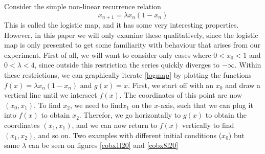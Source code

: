 \documentclass[12pt,oneside,a4paper]{article}
\numberwithin{equation}{section}
\begin{document}
{{{{Consider the simple non-linear recurrence relation
\begin{equation}
x_{n+1}=\lambda x_n (1-x_n)
\label{logmap}
\end{equation}
This is called the logistic map, and it has some very interesting properties. However, in this paper we will only examine these qualitatively, since the logistic map is only presented to get some familiarity with behaviour that arises from our experiment. First of all, we will want to consider only cases where $0<x_0<1$ and $0<\lambda<4$, since outside this restriction the series quickly diverges to $-\infty$. Within these restrictions, we can graphically iterate \eqref{logmap} by plotting the functions $f(x)=\lambda x_n (1-x_n)$ and $g(x)=x$. First, we start off with an $x_0$ and draw a vertical line until we intersect $f(x)$. The coordinates of this point are now $(x_0,x_1)$. To find $x_2$, we need to find$x_1$ on the $x$-axis, such that we can plug it into $f(x)$ to obtain $x_2$. Therefor, we go horizontally to $g(x)$ to obtain the coordinates $(x_1,x_1)$, and we can now return to $f(x)$ vertically to find $(x_1,x_2)$, and so on. Two examples with different initial conditions ($x_0$) but same $\lambda$ can be seen on figures \ref{cobx1l20} and \ref{cobx8l20}

}}}}
\end{document}

